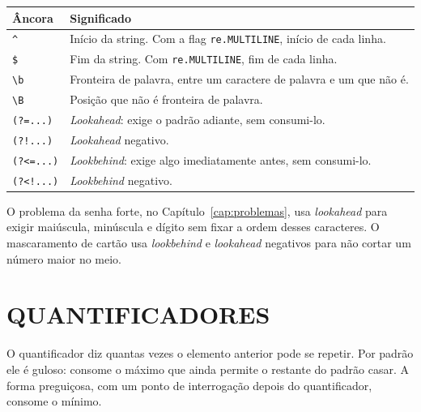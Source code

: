 \documentclass[
    12pt,
    oneside,
    a4paper,
    chapter=TITLE,
    section=TITLE,
    sumario=abnt-6027-2012
]{abntex2}
\begin{document}
\begin{quadro}[!h]
    \centering
    \small
    \begin{tabular}{|p{3.0cm}|p{11.0cm}|}
        \hline
        \textbf{Âncora} & \textbf{Significado} \\
        \hline
        \hline
        \verb|^| & Início da string. Com a flag \texttt{re.MULTILINE}, início de cada linha. \\
        \hline
        \verb|$| & Fim da string. Com \texttt{re.MULTILINE}, fim de cada linha. \\
        \hline
        \verb|\b| & Fronteira de palavra, entre um caractere de palavra e um que não é. \\
        \hline
        \verb|\B| & Posição que não é fronteira de palavra. \\
        \hline
        \verb|(?=...)| & \textit{Lookahead}: exige o padrão adiante, sem consumi-lo. \\
        \hline
        \verb|(?!...)| & \textit{Lookahead} negativo. \\
        \hline
        \verb|(?<=...)| & \textit{Lookbehind}: exige algo imediatamente antes, sem consumi-lo. \\
        \hline
        \verb|(?<!...)| & \textit{Lookbehind} negativo. \\
        \hline
    \end{tabular}
    \fonteautoria
\end{quadro}

O problema da senha forte, no Capítulo~\ref{cap:problemas}, usa \textit{lookahead} para exigir maiúscula, minúscula e dígito sem fixar a ordem desses caracteres. O mascaramento de cartão usa \textit{lookbehind} e \textit{lookahead} negativos para não cortar um número maior no meio.

\section{QUANTIFICADORES}
\label{sec:quant}

O quantificador diz quantas vezes o elemento anterior pode se repetir. Por padrão ele é guloso: consome o máximo que ainda permite o restante do padrão casar. A forma preguiçosa, com um ponto de interrogação depois do quantificador, consome o mínimo.
\end{document}
